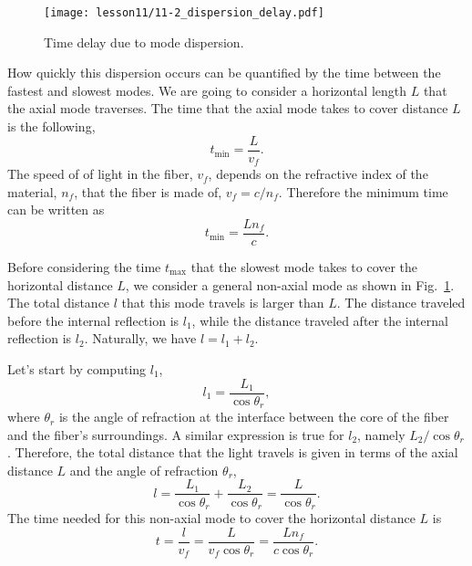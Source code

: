 \begin{figure}
    \centering
    \texttt{[image: lesson11/11-2\_dispersion\_delay.pdf]}
    \caption[Time delay due to mode dispersion.]{Time delay due to mode dispersion.}
    \label{fig:11-2_dispersion_delay}
\end{figure}

How quickly this dispersion occurs can be quantified by the time between the fastest and slowest modes.
We are going to consider a horizontal length $L$ that the axial mode traverses.
The time that the axial mode takes to cover distance $L$ is the following,
\begin{equation}
    t_{\min } =\frac{L}{v_f}.
\end{equation}
The speed of of light in the fiber, $v_f$, depends on the refractive index of the material, $n_f$, that the fiber is made of, $v_f = c / n_f$.
Therefore the minimum time can be written as
\begin{equation}
    t_{\min } =\frac{Ln_f}{c}.
\end{equation}

Before considering the time $t_{\max}$ that the slowest mode takes to cover the horizontal distance $L$, we consider a general non-axial mode as shown in Fig.~\ref{fig:11-2_dispersion_delay}.
The total distance $l$ that this mode travels is larger than $L$.
The distance traveled before the internal reflection is $l_1$, while the distance traveled after the internal reflection is $l_2$.
Naturally, we have $l = l_1 + l_2$.

Let's start by computing $l_1$,
\begin{equation}
    l_1=\frac{L_1}{\cos \theta_r},
\end{equation}
where $\theta_r$ is the angle of refraction at the interface between the core of the fiber and the fiber's surroundings.
A similar expression is true for $l_2$, namely $L_2 / \cos \theta_r$.
Therefore, the total distance that the light travels is given in terms of the axial distance $L$ and the angle of refraction $\theta_r$,
\begin{equation}
    l=\frac{L_1}{\cos \theta_r}+\frac{L_2}{\cos \theta_r}=\frac{L}{\cos \theta_r}.
\end{equation}
The time needed for this non-axial mode to cover the horizontal distance $L$ is
\begin{equation}
    t = \frac{l}{v_f} = \frac{L}{v_f \cos \theta_r} = \frac{L n_f}{c \cos \theta_r}.
    \label{eq:11-2_time_nonaxial}
\end{equation}

